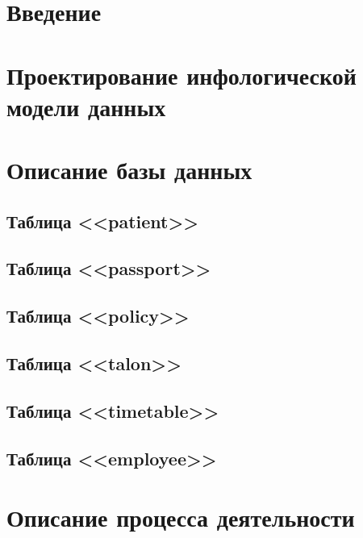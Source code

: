 






\newpage
{}
\tableofcontents

\newpage
{}
\section*{Введение}


\section{Проектирование инфологической модели данных}


\section{Описание базы данных}
\setcounter{figure}{0}

\subsection{Таблица <<patient>>}

\subsection{Таблица <<passport>>}

\subsection{Таблица <<policy>>}

\subsection{Таблица <<talon>>}

\subsection{Таблица <<timetable>>}

\subsection{Таблица <<employee>>}



\section{Описание процесса деятельности} 
\setcounter{figure}{0}

